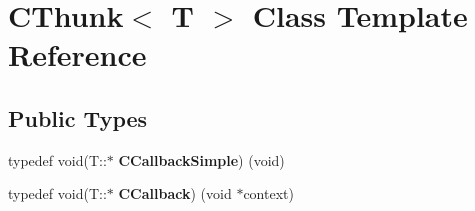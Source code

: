 \hypertarget{class_c_thunk}{}\section{C\+Thunk$<$ T $>$ Class Template Reference}
\label{class_c_thunk}
\subsection*{Public Types}
\begin{DoxyCompactItemize}
\item 
typedef void(T\+::$\ast$ {\bfseries C\+Callback\+Simple}) (void)\hypertarget{class_c_thunk_a80117a5ddadaa35142a409d9a7174da4}{}\label{class_c_thunk_a80117a5ddadaa35142a409d9a7174da4}

\item 
typedef void(T\+::$\ast$ {\bfseries C\+Callback}) (void $\ast$context)\hypertarget{class_c_thunk_a3b9fb86180e008ef76a22f7ea32a6450}{}\label{class_c_thunk_a3b9fb86180e008ef76a22f7ea32a6450}

\end{DoxyCompactItemize}
